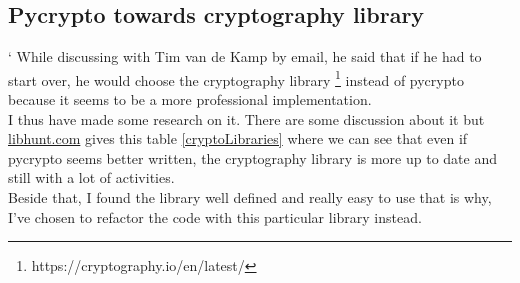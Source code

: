 \documentclass{eplmastersthesis}
\begin{document}
\subsection{Pycrypto towards cryptography library}`
While discussing with Tim van de Kamp by email, he said that if he had to start over, he would choose the cryptography library \footnote{https://cryptography.io/en/latest/} instead of pycrypto because it seems to be a more professional implementation.\\
I thus have made some research on it. There are some discussion about it but \url{libhunt.com} gives this table \ref{cryptoLibraries} where we can see that even if pycrypto seems better written, the cryptography library is more up to date and still with a lot of activities.\\
Beside that, I found the library well defined and really easy to use that is why, I've chosen to refactor the code with this particular library instead.
\end{document}
